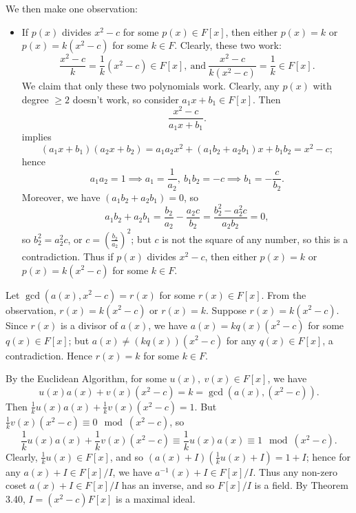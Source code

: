 \documentclass{homework}
\begin{document}
\begin{solution}
\begin{enumerate}[label=(\alph*)]
      We then make one observation:
      \begin{itemize}
        \item If $p(x)$ divides $x^2-c$ for some $p(x)\in F[x]$, then either $p(x)=k$ or
          $p(x)=k(x^2-c)$ for some $k\in F$. Clearly, these two work: \[
            \frac{x^2-c}{k}=\frac{1}{k}(x^2-c)\in F[x], ~\text{and}~
            \frac{x^2-c}{k(x^2-c)}=\frac{1}{k}\in F[x]
          .\] We claim that only these two polynomials work. Clearly, any $p(x)$ with degree $\ge 2$
          doesn't work, so consider $a_1x+b_1\in F[x]$. Then \[
            \frac{x^2-c}{a_1x+b_1}
          .\] implies \[
            (a_1x+b_1)(a_2x+b_2)=a_1a_2x^2+(a_1b_2+a_2b_1)x+b_1b_2=x^2-c
          ;\] hence \[
            a_1a_2=1 \implies a_1=\frac{1}{a_2},\ b_1b_2=-c\implies b_1=-\frac{c}{b_2}
          .\] Moreover, we have $(a_1b_2+a_2b_1)=0$, so \[
            a_1b_2+a_2b_1=\frac{b_2}{a_2}-\frac{a_2c}{b_2}=\frac{b_2^2-a_2^2c}{a_2b_2}=0
          ,\] so $b_2^2=a_2^2c$, or $c=\left( \frac{b_2}{a_2} \right)^2$; but $c$ is not the
          square of any number, so this is a contradiction. Thus if $p(x)$ divides $x^2-c$, then
          either $p(x)=k$ or $p(x)=k(x^2-c)$ for some $k\in F$.
      \end{itemize}
      Let $\gcd{(a(x),x^2-c)}=r(x)$ for some $r(x)\in F[x]$. From the observation, $r(x)=k(x^2-c)$
      or $r(x)=k$. Suppose $r(x)=k(x^2-c)$. Since $r(x)$ is a divisor of $a(x)$, we have
      $a(x)=kq(x)(x^2-c)$ for some $q(x)\in F[x]$; but $a(x)\neq (kq(x))(x^2-c)$ for any $q(x)\in
      F[x]$, a contradiction. Hence $r(x)=k$ for some $k\in F$.

      By the Euclidean Algorithm, for some $u(x),\ v(x)\in F[x]$, we have \[
        u(x)a(x)+v(x)(x^2-c)=k=\gcd{(a(x),(x^2-c))}
      .\] Then $\frac{1}{k}u(x)a(x)+\frac{1}{k}v(x)(x^2-c)=1$. But $\frac{1}{k}v(x)(x^2-c)\equiv
      0\mod{(x^2-c)}$, so \[
        \frac{1}{k}u(x)a(x)+\frac{1}{k}v(x)(x^2-c)\equiv \frac{1}{k}u(x)a(x)\equiv 1 \mod{(x^2-c)}
      .\] Clearly, $\frac{1}{k}u(x)\in F[x]$, and so $(a(x)+I)(\frac{1}{k}u(x)+I)=1+I$; hence for
      any $a(x)+I\in F[x] / I$, we have $a^{-1}(x)+I\in F[x] / I$. Thus any non-zero coset $a(x)+I\in
      F[x] / I$ has an inverse, and so $F[x] / I$ is a field. By Theorem 3.40, $I=(x^2-c)F[x]$ is a
      maximal ideal.
  \end{enumerate}
\end{solution}
\end{document}
